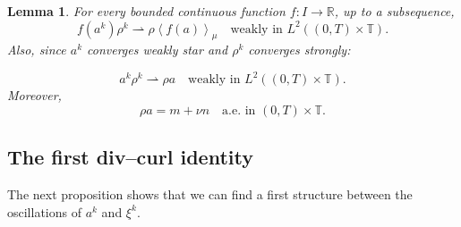 \documentclass[a4paper,twosided,11pt]{article}
\newcommand{\R}{\mathbb{R}}
\newcommand{\T}{\mathbb{T}}
\newcommand{\avmu}[1]{\left\langle #1 \right\rangle_{\mu}}
\newcommand{\1}{\mathbf{1}}
\theoremstyle{plain}
\newtheorem{lemma}[thm]{Lemma}
\theoremstyle{remark}
\newcommand{\weakto}{\rightharpoonup}
\numberwithin{equation}{section}
\begin{document}
\begin{lemma}
\label{lem:weak-limits-via-young}
For every bounded continuous function $f:I\to\R$, up to a subsequence,
$$
 f(a^k)\rho^k \weakto \rho \avmu{f(a)}
 \quad \text{weakly in } L^2((0,T)\times\T).
$$
Also, since $a^k$ converges weakly star and $\rho^k$ converges strongly:

\begin{equation*}
 a^k\rho^k \weakto \rho a
 \quad \text{weakly in } L^2((0,T)\times\T).
\end{equation*}
Moreover,
\begin{equation*}
 \rho a = m+\nu n
 \quad \text{a.e. in } (0,T)\times\T.
\end{equation*}
\end{lemma}



\subsection{The first div--curl identity}
The next proposition shows that we can find a first structure between the oscillations of $a^k$ and $\xi^k$.
\end{document}
